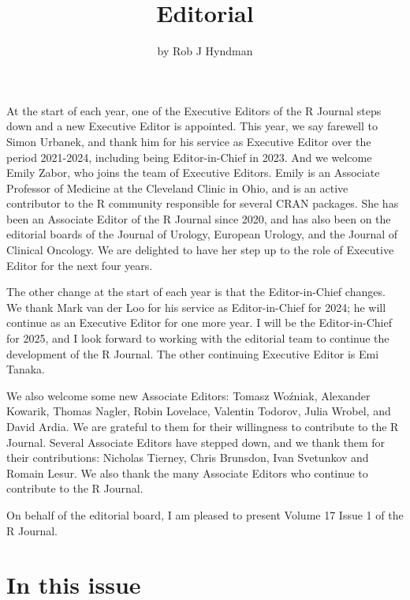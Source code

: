\title{Editorial}


\author{by Rob J Hyndman}

\maketitle


At the start of each year, one of the Executive Editors of the R Journal steps down and a new Executive Editor is appointed. This year, we say farewell to Simon Urbanek, and thank him for his service as Executive Editor over the period 2021-2024, including being Editor-in-Chief in 2023. And we welcome Emily Zabor, who joins the team of Executive Editors. Emily is an Associate Professor of Medicine at the Cleveland Clinic in Ohio, and is an active contributor to the R community responsible for several CRAN packages. She has been an Associate Editor of the R Journal since 2020, and has also been on the editorial boards of the Journal of Urology, European Urology, and the Journal of Clinical Oncology. We are delighted to have her step up to the role of Executive Editor for the next four years.

The other change at the start of each year is that the Editor-in-Chief changes. We thank Mark van der Loo for his service as Editor-in-Chief for 2024; he will continue as an Executive Editor for one more year. I will be the Editor-in-Chief for 2025, and I look forward to working with the editorial team to continue the development of the R Journal. The other continuing Executive Editor is Emi Tanaka.

We also welcome some new Associate Editors: Tomasz Woźniak, Alexander Kowarik, Thomas Nagler, Robin Lovelace, Valentin Todorov, Julia Wrobel, and David Ardia. We are grateful to them for their willingness to contribute to the R Journal. Several Associate Editors have stepped down, and we thank them for their contributions: Nicholas Tierney, Chris Brunsdon, Ivan Svetunkov and Romain Lesur. We also thank the many Associate Editors who continue to contribute to the R Journal.

On behalf of the editorial board, I am pleased to present Volume 17 Issue 1 of the R Journal.

\section*{In this issue}\label{in-this-issue}

